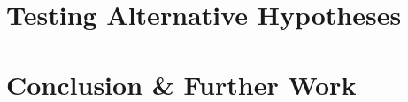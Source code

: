 \documentclass[11pt, oneside]{article}
\begin{document}
\section{Testing Alternative Hypotheses}


\section{Conclusion \& Further Work}


\begin{comment} 
\section{GARBAGE SECTION: Alternative Hypotheses}

In this section, I consider alternative explanations for the price differences I found between minority and white hosts. In particular, I examine three relevant mechanisms that are not discrimination that could explain my results. I will then argue that these mechanisms would be insufficient in doing so. 

\textbf{2. Price observed during the scrape is not the price normally set by hosts or observed by guests}

The prices I used in my data analysis were prices from one particular day in 2015-2016. I ran my regressions on the assumption that this is the price that hosts set and that guests observe that drives guest booking decisions and host revenue outcomes. However, imagine that for one day, all of the white people on Airbnb raise their prices. That day, the scrape happens to take place, and the next day, the prices of White hosts all go back down. Then, the price that I observed in my data for White hosts would be high even though it doesn't incorporate real demand differences between races nor is tied to listing characteristics or host quality. While this may seem like an unlikely scenario, price hikes for the weekend or for holidays like July 4th or New Year's may give rise to a similar situation if black hosts change their prices differently than White hosts. 

TO-DO - Check price time series data to prove that prices don't move around that much during the month/year. 

\textbf{3. Data clean-up disproportionately dropped lower-priced listings of White hosts or higher-priced listings of minority hosts}


\end{comment}
\end{document}
